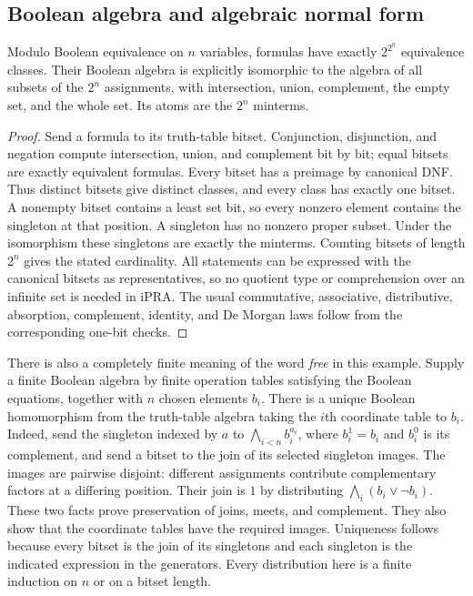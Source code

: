 \subsection{Boolean algebra and algebraic normal form}

\begin{theorem}\label{ca-finite-algebra}
Modulo Boolean equivalence on $n$ variables, formulas have exactly
$2^{2^n}$ equivalence classes.  Their Boolean algebra is explicitly
isomorphic to the algebra of all subsets of the $2^n$ assignments, with
intersection, union, complement, the empty set, and the whole set.
Its atoms are the $2^n$ minterms.
\end{theorem}
\begin{proof}
Send a formula to its truth-table bitset.  Conjunction, disjunction, and
negation compute intersection, union, and complement bit by bit; equal
bitsets are exactly equivalent formulas.  Every bitset has a preimage by
canonical DNF.  Thus distinct bitsets give distinct classes, and every class
has exactly one bitset.  A nonempty bitset contains a least set bit, so every
nonzero element contains the singleton at that position.  A singleton has
no nonzero proper subset.  Under the isomorphism these singletons are exactly
the minterms.  Counting bitsets of length $2^n$ gives the stated cardinality.
All statements can be expressed with the canonical bitsets as representatives,
so no quotient type or comprehension over an infinite set is needed in iPRA.
The usual commutative, associative, distributive, absorption, complement,
identity, and De Morgan laws follow from the corresponding one-bit checks.
\end{proof}

There is also a completely finite meaning of the word \emph{free} in this
example.  Supply a finite Boolean algebra by finite operation tables satisfying
the Boolean equations, together with $n$ chosen elements $b_i$.  There is a
unique Boolean homomorphism from the truth-table algebra taking the $i$th
coordinate table to $b_i$.  Indeed, send the singleton indexed by $a$ to
$\bigwedge_{i<n}b_i^{a_i}$, where $b_i^1=b_i$ and $b_i^0$ is its complement,
and send a bitset to the join of its selected singleton images.  The images
are pairwise disjoint: different assignments contribute complementary
factors at a differing position.  Their join is $1$ by distributing
$\bigwedge_i(b_i\vee\neg b_i)$.  These two facts prove preservation of joins,
meets, and complement.  They also show that the coordinate tables have the
required images.  Uniqueness follows because every bitset is the join of its
singletons and each singleton is the indicated expression in the generators.
Every distribution here is a finite induction on $n$ or on a bitset length.

